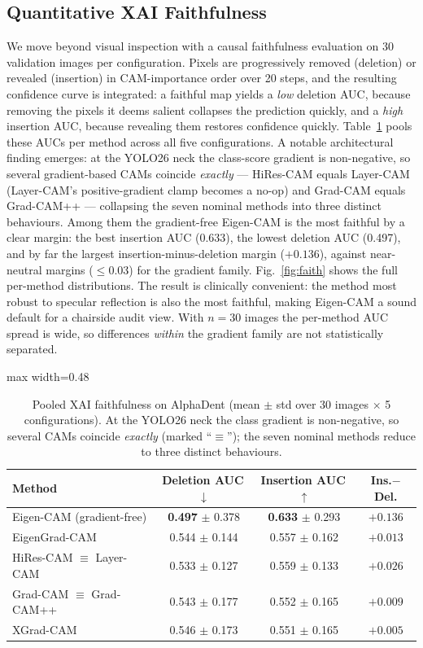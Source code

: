 \documentclass[conference]{IEEEtran}
\begin{document}
\subsection{Quantitative XAI Faithfulness}
We move beyond visual inspection with a causal faithfulness evaluation on 30 validation images per configuration. Pixels are progressively removed (deletion) or revealed (insertion) in CAM-importance order over 20 steps, and the resulting confidence curve is integrated: a faithful map yields a \emph{low} deletion AUC, because removing the pixels it deems salient collapses the prediction quickly, and a \emph{high} insertion AUC, because revealing them restores confidence quickly. Table~\ref{tab:faith} pools these AUCs per method across all five configurations. A notable architectural finding emerges: at the YOLO26 neck the class-score gradient is non-negative, so several gradient-based CAMs coincide \emph{exactly} --- HiRes-CAM equals Layer-CAM (Layer-CAM's positive-gradient clamp becomes a no-op) and Grad-CAM equals Grad-CAM++ --- collapsing the seven nominal methods into three distinct behaviours. Among them the gradient-free Eigen-CAM is the most faithful by a clear margin: the best insertion AUC (0.633), the lowest deletion AUC (0.497), and by far the largest insertion-minus-deletion margin ($+0.136$), against near-neutral margins ($\leq\!0.03$) for the gradient family. Fig.~\ref{fig:faith} shows the full per-method distributions. The result is clinically convenient: the method most robust to specular reflection is also the most faithful, making Eigen-CAM a sound default for a chairside audit view. With $n{=}30$ images the per-method AUC spread is wide, so differences \emph{within} the gradient family are not statistically separated.

\begin{table}[htbp]
\caption{Pooled XAI faithfulness on AlphaDent (mean $\pm$ std over 30 images $\times$ 5 configurations). At the YOLO26 neck the class gradient is non-negative, so several CAMs coincide \emph{exactly} (marked ``$\equiv$''); the seven nominal methods reduce to three distinct behaviours.}
\label{tab:faith}
\centering
\begin{adjustbox}{max width=0.48\textwidth}
\begin{tabular}{lccc}
\toprule
\textbf{Method} & \textbf{Deletion AUC}\,$\downarrow$ & \textbf{Insertion AUC}\,$\uparrow$ & \textbf{Ins.$-$Del.} \\
\midrule
\rowcolor{highlightColor}
Eigen-CAM (gradient-free) & \textbf{0.497} $\pm$ 0.378 & \textbf{0.633} $\pm$ 0.293 & $\mathbf{+0.136}$ \\
EigenGrad-CAM & 0.544 $\pm$ 0.144 & 0.557 $\pm$ 0.162 & $+0.013$ \\
HiRes-CAM $\equiv$ Layer-CAM & 0.533 $\pm$ 0.127 & 0.559 $\pm$ 0.133 & $+0.026$ \\
Grad-CAM $\equiv$ Grad-CAM++ & 0.543 $\pm$ 0.177 & 0.552 $\pm$ 0.165 & $+0.009$ \\
XGrad-CAM & 0.546 $\pm$ 0.173 & 0.551 $\pm$ 0.165 & $+0.005$ \\
\bottomrule
\end{tabular}
\end{adjustbox}
\end{table}
\end{document}
